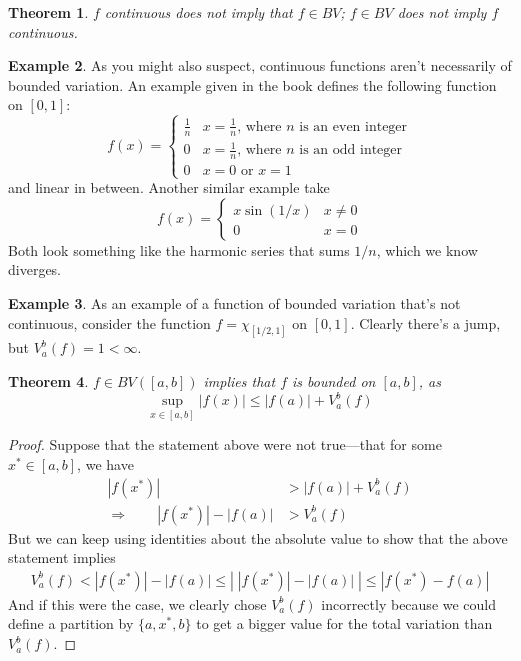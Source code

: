 \documentclass[12pt]{article}
\theoremstyle{plain}
\newtheorem{thm}{Theorem}[subsection]
\theoremstyle{definition}
\newtheorem{ex}[thm]{Example}
\theoremstyle{remark}
\begin{document}
\begin{thm}
$f$ continuous does not imply that $f\in BV$; $f \in BV$ does not imply $f$ continuous.
\end{thm}
\begin{ex}
As you might also suspect, continuous functions aren't necessarily of bounded variation. An example given in the book defines the following function on $[0,1]$:
    \[ f(x) = 
        \begin{cases}
        \frac{1}{n} & \text{$x = \frac{1}{n}$, where $n$ is an even integer}\\
        0 & \text{$x = \frac{1}{n}$, where $n$ is an odd integer} \\
        0 & \text{$x = 0$ or $x = 1$}
        \end{cases}
    \]
and linear in between.  Another similar example take
    \[ f(x) = 
        \begin{cases}
            x \sin(1/x) & x\neq 0 \\
            0 & x=0 
        \end{cases} \]
Both look something like the harmonic series that sums $1/n$, which we know diverges.
\end{ex}
\begin{ex}
As an example of a function of bounded variation that's not continuous, consider the function $f=\chi_{[1/2,1]}$ on $[0,1]$. Clearly there's a jump, but $V_a^b(f) = 1 < \infty$.
\end{ex}

\begin{thm}
$f\in BV([a,b])$ implies that $f$ is bounded on $[a,b]$, as 
    \[ \sup_{x\in[a,b]} |f(x) | \leq |f(a)| + V_a^b(f) \]
\end{thm}
\begin{proof}
Suppose that the statement above were not true---that for some $x^* \in [a,b]$, we have
\begin{align*}
    |f(x^*)| &> |f(a)| + V_a^b(f) \\
    \Rightarrow \qquad 
        |f(x^*)| - |f(a)|  &> V_a^b(f) 
\end{align*}
But we can keep using identities about the absolute value to show that the above statement implies
\begin{align*}
    V_a^b(f) < |f(x^*)| - |f(a)| \leq \left\lvert \;
        |f(x^*)| - |f(a)|\;\right\rvert
        \leq |f(x^*) - f(a)|
\end{align*}
And if this were the case, we clearly chose $V_a^b(f)$ incorrectly because we could define a partition by $\{a, x^*, b\}$ to get a bigger value for the total variation than $V_a^b(f)$.
\end{proof}
\end{document}

